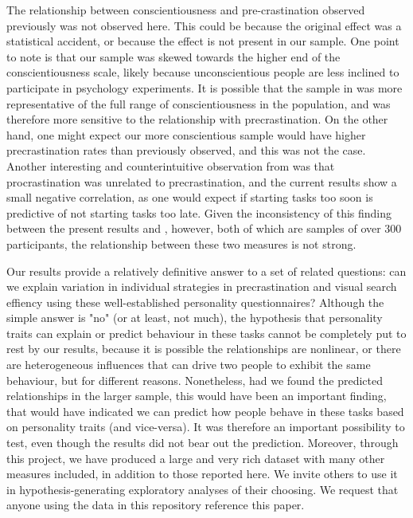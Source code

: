 \documentclass[]{rsos}
\begin{document}
The relationship between conscientiousness and pre-crastination observed previously \cite{sauerberger2019} was not observed here. This could be because the original effect was a statistical accident, or because the effect is not present in our sample. One point to note is that our sample was skewed towards the higher end of the conscientiousness scale, likely because unconscientious people are less inclined to participate in psychology experiments. It is possible that the sample in \cite{sauerberger2019} was more representative of the full range of conscientiousness in the population, and was therefore more sensitive to the relationship with precrastination. On the other hand, one might expect our more conscientious sample would have higher precrastination rates than previously observed, and this was not the case. Another interesting and counterintuitive observation from \cite{sauerberger2019} was that procrastination was unrelated to precrastination, and the current results show a small negative correlation, as one would expect if starting tasks too soon is predictive of not starting tasks too late. Given the inconsistency of this finding between the present results and \cite{sauerberger2019}, however, both of which are samples of over 300 participants, the relationship between these two measures is not strong.

Our results provide a relatively definitive answer to a set of related questions: can we explain variation in individual strategies in precrastination and visual search effiency using these well-established personality questionnaires? Although the simple answer is "no" (or at least, not much), the hypothesis that personality traits can explain or predict behaviour in these tasks cannot be completely put to rest by our results, because it is possible the relationships are nonlinear, or there are heterogeneous influences that can drive two people to exhibit the same behaviour, but for different reasons. Nonetheless, had we found the predicted relationships in the larger sample, this would have been an important finding, that would have indicated we can predict how people behave in these tasks based on personality traits (and vice-versa). It was therefore an important possibility to test, even though the results did not bear out the prediction. Moreover, through this project, we have produced a large and very rich dataset with many other measures included, in addition to those reported here. We invite others to use it in hypothesis-generating exploratory analyses of their choosing. We request that anyone using the data in this repository reference this paper.



\small

\end{document}
